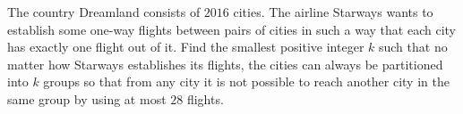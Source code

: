 The country Dreamland consists of $2016$ cities. The airline Starways wants to establish some one-way flights between pairs of cities in such a way that each city has exactly one flight out of it. Find the smallest positive integer $k$ such that no matter how Starways establishes its flights, the cities can always be partitioned into $k$ groups so that from any city it is not possible to reach another city in the same group by using at most $28$ flights.
